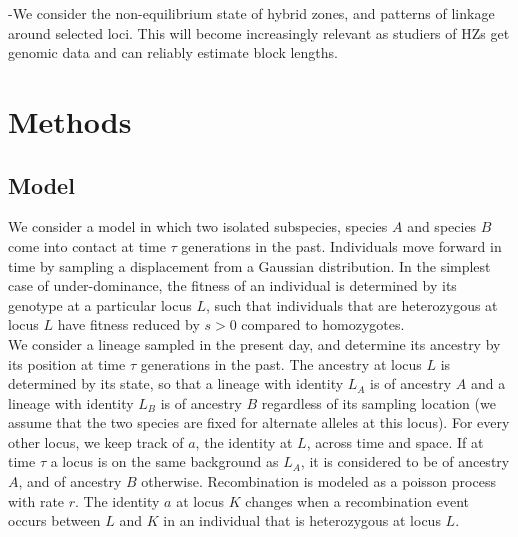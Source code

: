 \documentclass[12pt]{amsart}
\begin{document}
-We consider the non-equilibrium state of hybrid zones, and patterns of linkage around selected loci. This will become increasingly relevant as studiers of HZs get genomic data and can reliably estimate block lengths. \\

	
\section{Methods}
\subsection{Model}
We consider a model in which two isolated subspecies, species $A$ and species $B$ come into contact at time $\tau$ generations in the past. Individuals move forward in time by sampling a displacement from a Gaussian distribution. In the simplest case of under-dominance, the fitness of an individual is determined by its genotype at a particular locus $L$, such that individuals that are heterozygous at locus $L$ have fitness reduced by $s>0$ compared to homozygotes.\\

We consider a lineage sampled in the present day, and determine its ancestry by its position at time $\tau$ generations in the past. The ancestry at locus $L$ is determined by its state, so that a lineage with identity $L_A$ is of ancestry $A$ and a lineage with identity $L_B$ is of ancestry $B$ regardless of its sampling location (we assume that the two species are fixed for alternate alleles at this locus). For every other locus, we keep track of $a$, the identity at $L$, across time and space. If at time $\tau$ a locus is on the same background as $L_A$, it is considered to be of ancestry $A$, and of ancestry $B$ otherwise. Recombination is modeled as a poisson process with rate $r$. The identity $a$ at locus $K$ changes when a recombination event occurs between $L$ and $K$ in an individual that is heterozygous at locus $L$. 
\\
\end{document}
